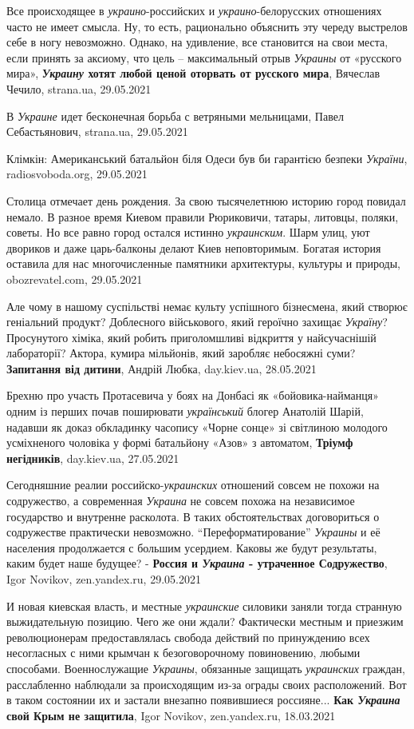Все происходящее в \emph{украино}-российских и \emph{украино}-белорусских
отношениях часто не имеет смысла. Ну, то есть, рационально объяснить эту череду
выстрелов себе в ногу невозможно. Однако, на удивление, все становится на свои
места, если принять за аксиому, что цель – максимальный отрыв \emph{Украины} от
«русского мира», \textbf{\emph{Украину} хотят любой ценой оторвать от русского
мира}, Вячеслав Чечило, strana.ua, 29.05.2021

В \emph{Украине} идет бесконечная борьба с ветряными мельницами, Павел Себастьянович,
strana.ua, 29.05.2021

Клімкін: Американський батальйон біля Одеси був би гарантією безпеки \emph{України}, 
radiosvoboda.org, 29.05.2021

Столица отмечает день рождения. За свою тысячелетнюю историю город повидал
немало. В разное время Киевом правили Рюриковичи, татары, литовцы, поляки,
советы. Но все равно город остался истинно \emph{украинским}. Шарм улиц, уют
двориков и даже царь-балконы делают Киев неповторимым. Богатая история оставила
для нас многочисленные памятники архитектуры, культуры и природы, obozrevatel.com, 29.05.2021

Але чому в нашому суспільстві немає культу успішного бізнесмена, який створює
геніальний продукт? Доблесного військового, який героїчно захищає
\emph{Україну}?  Просунутого хіміка, який робить приголомшливі відкриття у
найсучаснішій лабораторії? Актора, кумира мільйонів, який заробляє небосяжні
суми? \textbf{Запитання від дитини}, Андрій Любка, day.kiev.ua, 28.05.2021

Брехню про участь Протасевича у боях на Донбасі як «бойовика-найманця» одним із
перших почав поширювати \emph{український} блогер Анатолій Шарій, надавши як
доказ обкладинку часопису «Чорне сонце» зі світлиною молодого усміхненого
чоловіка у формі батальйону «Азов» з автоматом, \textbf{Тріумф негідників},
day.kiev.ua, 27.05.2021

Сегодняшние реалии российско-\emph{украинских} отношений совсем не похожи на
содружество, а современная \emph{Украина} не совсем похожа на независимое
государство и внутренне расколота. В таких обстоятельствах договориться о
содружестве практически невозможно. \enquote{Переформатирование} \emph{Украины}
и её населения продолжается с большим усердием. Каковы же будут результаты,
каким будет наше будущее? - \textbf{Россия и \emph{Украина} - утраченное
Содружество}, Igor Novikov, zen.yandex.ru, 29.05.2021

И новая киевская власть, и местные \emph{украинские} силовики заняли тогда
странную выжидательную позицию. Чего же они ждали? Фактически местным и
приезжим революционерам предоставлялась свобода действий по принуждению всех
несогласных с ними крымчан к безоговорочному повиновению, любыми способами.
Военнослужащие \emph{Украины}, обязанные защищать \emph{украинских} граждан,
расслабленно наблюдали за происходящим из-за ограды своих расположений. Вот в
таком состоянии их и застали внезапно появившиеся россияне... \textbf{Как
\emph{Украина} свой Крым не защитила}, Igor Novikov, zen.yandex.ru, 18.03.2021

